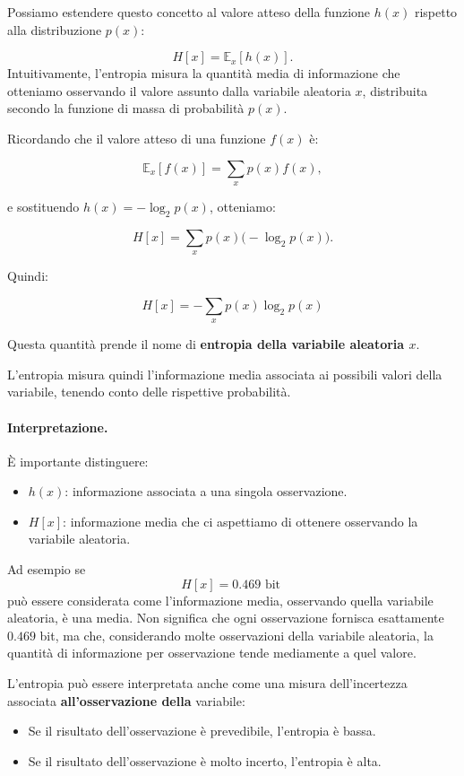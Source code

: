 Possiamo estendere questo concetto al valore atteso della funzione $h(x)$ rispetto alla distribuzione $p(x)$:

\[
    H[x]=\mathbb{E}_{x}[h(x)].
\]
Intuitivamente, l'entropia misura la quantità media di informazione che otteniamo osservando il valore assunto dalla variabile aleatoria \(x\), distribuita secondo la funzione di massa di probabilità \(p(x)\).

\newpage
Ricordando che il valore atteso di una funzione $f(x)$ è:

\[
    \mathbb{E}_{x}[f(x)]
    =
    \sum_x p(x)f(x),
\]

e sostituendo $h(x)=-\log_2 p(x)$, otteniamo:

\[
    H[x]
    =
    \sum_x p(x)\bigl(-\log_2 p(x)\bigr).
\]

Quindi:

\[
    \boxed{
        H[x]=-\sum_x p(x)\log_2 p(x)
    }
\]

Questa quantità prende il nome di \textbf{entropia della variabile aleatoria $x$}.

L'entropia misura quindi l'informazione media associata ai possibili valori della variabile, tenendo conto delle rispettive probabilità.

\paragraph{Interpretazione.}

È importante distinguere:
\begin{itemize}
    \item $h(x)$: informazione associata a una singola osservazione.
    \item $H[x]$: informazione media che ci aspettiamo di ottenere osservando la variabile aleatoria.
\end{itemize}
Ad esempio se
\[
H[x]=0.469\text{ bit }
\]
può essere considerata come l'informazione media, osservando quella variabile aleatoria, è una media.
Non significa che ogni osservazione fornisca esattamente \(0.469\) bit, ma che, considerando molte osservazioni della variabile aleatoria, la quantità di informazione per osservazione tende mediamente a quel valore.

L'entropia può essere interpretata anche come una misura dell'incertezza associata \textbf{all'osservazione della} variabile:
\begin{itemize}
    \item Se il risultato dell'osservazione è prevedibile, l'entropia è bassa.
    \item Se il risultato dell'osservazione è molto incerto, l'entropia è alta.
\end{itemize}

